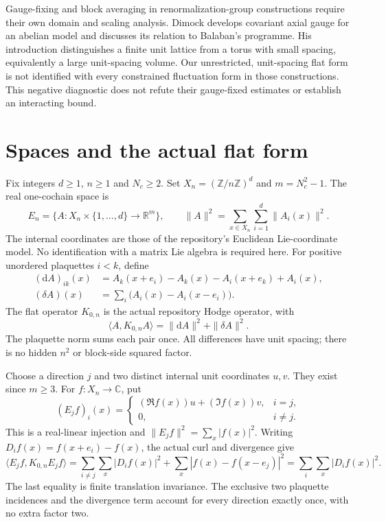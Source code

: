 \documentclass[11pt]{article}
\newcommand{\R}{\mathbb R}
\newcommand{\C}{\mathbb C}
\newcommand{\ip}[2]{\langle #1,#2\rangle}
\begin{document}
Gauge-fixing and block averaging in renormalization-group constructions
require their own domain and scaling analysis. Dimock \cite{dimock} develops
covariant axial gauge for an abelian model and discusses its relation to
Balaban's programme. His introduction distinguishes a finite unit lattice
from a torus with small spacing, equivalently a large unit-spacing volume.
Our unrestricted, unit-spacing flat form is not identified with every
constrained fluctuation form in those constructions. This negative diagnostic
does not refute their gauge-fixed estimates or establish an interacting bound.

\section{Spaces and the actual flat form}
Fix integers $d\geq1$, $n\geq1$ and $N_c\geq2$. Set
$X_n=(\mathbb Z/n\mathbb Z)^d$ and $m=N_c^2-1$. The real one-cochain space is
\[
 E_n=\{A:X_n\times\{1,\ldots,d\}\longrightarrow\R^m\},\qquad
 \|A\|^2=\sum_{x\in X_n}\sum_{i=1}^d\|A_i(x)\|^2.
\]
The internal coordinates are those of the repository's Euclidean Lie-coordinate
model. No identification with a matrix Lie algebra is required here.
For positive unordered plaquettes $i<k$, define
\begin{align*}
 (\mathrm dA)_{ik}(x)&=A_k(x+e_i)-A_k(x)-A_i(x+e_k)+A_i(x),\\
 (\delta A)(x)&=\sum_i\bigl(A_i(x)-A_i(x-e_i)\bigr).
\end{align*}
The flat operator $K_{0,n}$ is the actual repository Hodge operator, with
\begin{equation}\label{eq:hodge}
 \ip{A}{K_{0,n}A}=\|\mathrm dA\|^2+\|\delta A\|^2.
\end{equation}
The plaquette norm sums each pair once. All differences have unit spacing;
there is no hidden $n^2$ or block-side squared factor.

Choose a direction $j$ and two distinct internal unit coordinates $u,v$.
They exist since $m\geq3$. For $f:X_n\to\C$, put
\[
 (E_jf)_i(x)=\begin{cases}(\Re f(x))u+(\Im f(x))v,&i=j,\\0,&i\ne j.\end{cases}
\]
This is a real-linear injection and $\|E_jf\|^2=\sum_x|f(x)|^2$.
Writing $D_i f(x)=f(x+e_i)-f(x)$, the actual curl and divergence give
\begin{equation}\label{eq:stencil}
 \ip{E_jf}{K_{0,n}E_jf}
 =\sum_{i\ne j}\sum_x|D_i f(x)|^2+
   \sum_x|f(x)-f(x-e_j)|^2
 =\sum_i\sum_x|D_i f(x)|^2.
\end{equation}
The last equality is finite translation invariance. The exclusive two
plaquette incidences and the divergence term account for every direction
exactly once, with no extra factor two.
\end{document}
